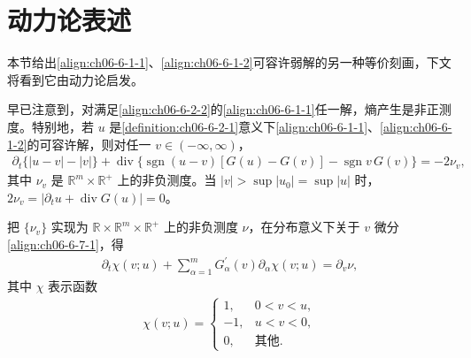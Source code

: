 \documentclass[../../main.tex]{subfiles}
\begin{document}
\section{动力论表述}\label{section:ch06-动力论表述}

本节给出\eqref{align:ch06-6-1-1}、\eqref{align:ch06-6-1-2}可容许弱解的另一种等价刻画，下文将看到它由动力论启发。

早已注意到，对满足\eqref{align:ch06-6-2-2}的\eqref{align:ch06-6-1-1}任一解，熵产生是非正测度。特别地，若 $u$ 是\cref{definition:ch06-6-2-1}意义下\eqref{align:ch06-6-1-1}、\eqref{align:ch06-6-1-2}的可容许解，则对任一 $v\in(-\infty,\infty)$，
\begin{align}
\partial_{t}\{|u-v|-|v|\}+\operatorname{div}\{\operatorname{sgn}(u-v)[G(u)-G(v)]-\operatorname{sgn}v\,G(v)\}=-2\nu_{v},
\label{align:ch06-6-7-1}
\end{align}
其中 $\nu_{v}$ 是 $\mathbb{R}^{m}\times\mathbb{R}^{+}$ 上的非负测度。当 $|v|>\sup|u_{0}|=\sup|u|$ 时，$2\nu_{v}=|\partial_{t}u+\operatorname{div}G(u)|=0$。

把 $\{\nu_{v}\}$ 实现为 $\mathbb{R}\times\mathbb{R}^{m}\times\mathbb{R}^{+}$ 上的非负测度 $\nu$，在分布意义下关于 $v$ 微分\eqref{align:ch06-6-7-1}，得
\begin{align}
\partial_{t}\chi(v;u)+\sum_{\alpha=1}^{m}G_{\alpha}^{\prime}(v)\partial_{\alpha}\chi(v;u)=\partial_{v}\nu,
\label{align:ch06-6-7-2}
\end{align}
其中 $\chi$ 表示函数
\begin{align}
\chi(v;u)=
\begin{cases}
1, & 0<v<u,\\
-1, & u<v<0,\\
0, & \text{其他}.
\end{cases}
\label{align:ch06-6-7-3}
\end{align}
\end{document}
